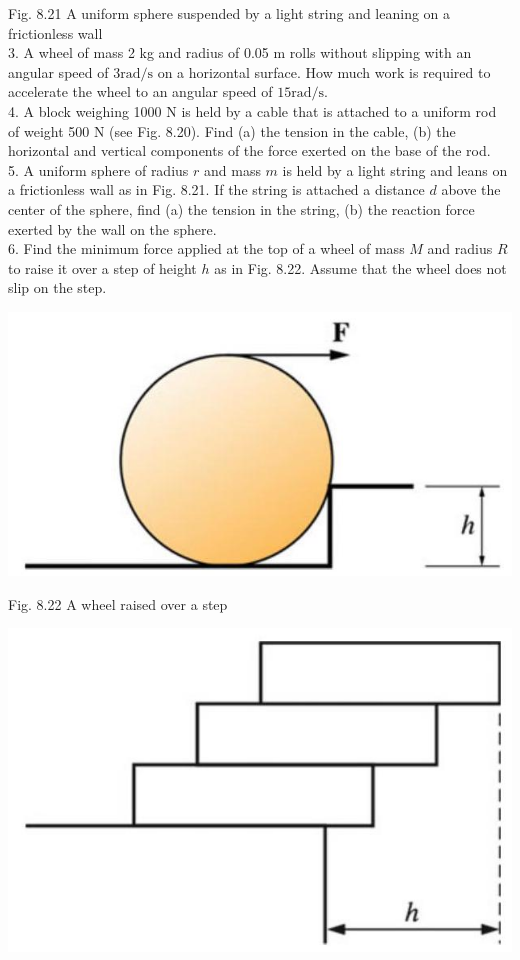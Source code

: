 \documentclass[10pt]{article}
\begin{document}
Fig. 8.21 A uniform sphere suspended by a light string and leaning on a frictionless wall\\
3. A wheel of mass 2 kg and radius of 0.05 m rolls without slipping with an angular speed of $3 \mathrm{rad} / \mathrm{s}$ on a horizontal surface. How much work is required to accelerate the wheel to an angular speed of $15 \mathrm{rad} / \mathrm{s}$.\\
4. A block weighing 1000 N is held by a cable that is attached to a uniform rod of weight 500 N (see Fig. 8.20). Find (a) the tension in the cable, (b) the horizontal and vertical components of the force exerted on the base of the rod.\\
5. A uniform sphere of radius $r$ and mass $m$ is held by a light string and leans on a frictionless wall as in Fig. 8.21. If the string is attached a distance $d$ above the center of the sphere, find (a) the tension in the string, (b) the reaction force exerted by the wall on the sphere.\\
6. Find the minimum force applied at the top of a wheel of mass $M$ and radius $R$ to raise it over a step of height $h$ as in Fig. 8.22. Assume that the wheel does not slip on the step.

\begin{center}
\includegraphics[max width=\textwidth]{2024_09_13_db1f357d2aad0a03eb2eg-141}
\end{center}

Fig. 8.22 A wheel raised over a step

\begin{center}
\includegraphics[max width=\textwidth]{2024_09_13_db1f357d2aad0a03eb2eg-141(2)}
\end{center}
\end{document}
